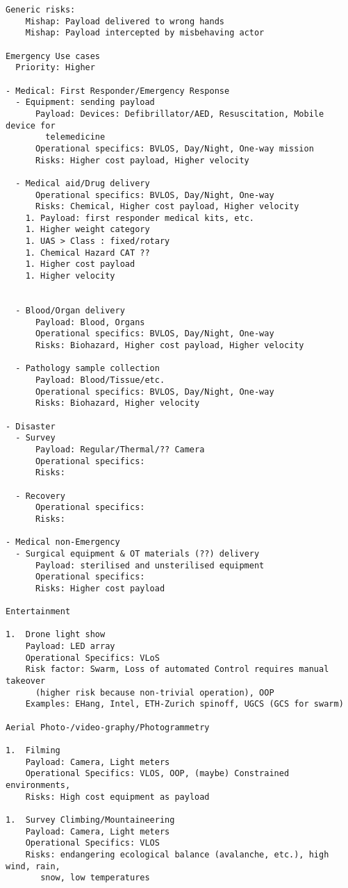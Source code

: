 \documentclass{ua_wgs_base}
\begin{document}
\begin{verbatim}
Generic risks:
    Mishap: Payload delivered to wrong hands
    Mishap: Payload intercepted by misbehaving actor

Emergency Use cases
  Priority: Higher

- Medical: First Responder/Emergency Response
  - Equipment: sending payload
      Payload: Devices: Defibrillator/AED, Resuscitation, Mobile device for 
        telemedicine
      Operational specifics: BVLOS, Day/Night, One-way mission
      Risks: Higher cost payload, Higher velocity

  - Medical aid/Drug delivery
      Operational specifics: BVLOS, Day/Night, One-way
      Risks: Chemical, Higher cost payload, Higher velocity
    1. Payload: first responder medical kits, etc.
    1. Higher weight category
    1. UAS > Class : fixed/rotary
    1. Chemical Hazard CAT ??
    1. Higher cost payload
    1. Higher velocity


  - Blood/Organ delivery
      Payload: Blood, Organs
      Operational specifics: BVLOS, Day/Night, One-way
      Risks: Biohazard, Higher cost payload, Higher velocity

  - Pathology sample collection
      Payload: Blood/Tissue/etc.
      Operational specifics: BVLOS, Day/Night, One-way
      Risks: Biohazard, Higher velocity
    
- Disaster
  - Survey
      Payload: Regular/Thermal/?? Camera
      Operational specifics: 
      Risks:

  - Recovery
      Operational specifics: 
      Risks:

- Medical non-Emergency
  - Surgical equipment & OT materials (??) delivery
      Payload: sterilised and unsterilised equipment
      Operational specifics: 
      Risks: Higher cost payload

Entertainment

1.  Drone light show
    Payload: LED array
    Operational Specifics: VLoS
    Risk factor: Swarm, Loss of automated Control requires manual takeover 
      (higher risk because non-trivial operation), OOP
    Examples: EHang, Intel, ETH-Zurich spinoff, UGCS (GCS for swarm)

Aerial Photo-/video-graphy/Photogrammetry

1.  Filming
    Payload: Camera, Light meters
    Operational Specifics: VLOS, OOP, (maybe) Constrained environments,
    Risks: High cost equipment as payload

1.  Survey Climbing/Mountaineering
    Payload: Camera, Light meters
    Operational Specifics: VLOS
    Risks: endangering ecological balance (avalanche, etc.), high wind, rain,
       snow, low temperatures
    

\end{verbatim}
\end{document}
